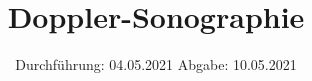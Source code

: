

\subject{US3}
\title{Doppler-Sonographie}
\date{%
  Durchführung: 04.05.2021
  \hspace{3em}
  Abgabe: 10.05.2021
}



\maketitle
\thispagestyle{empty}
\tableofcontents
\newpage







\printbibliography{}


